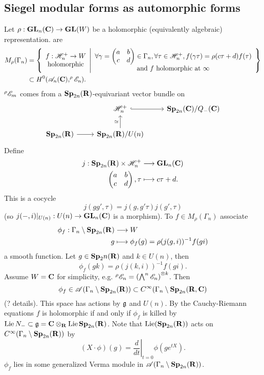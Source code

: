 \subsection{Siegel modular forms as automorphic forms}
Let $\rho:\GL_n(\C)\to \GL(W)$ be a holomorphic (equivalently algebraic) representation.
 are
\begin{align*}
	M_\rho(\Gamma_n) &= \left\{
		\begin{array}{c} f:\H_n^{+}\to W \\ \text{holomorphic}
		\end{array} \middle|
		\begin{array}{c}
			\forall \gamma =
			\begin{pmatrix} a & b \\ c & d
			\end{pmatrix} \in \Gamma_n,\forall \tau\in \H_n^{+}, f(\gamma \tau) = \rho(c\tau+d)f(\tau)\\
			\text{and }f\text{ holomorphic at }\infty
	\end{array} \right\} \\
	&\subset H^{0}(\CA_n(\C),^{\rho}\CE_n).
\end{align*}
$^{\rho}\mathscr{E}_m$ comes from a $\mathbf{Sp}_{2n}(\mathbf{R})$-equivariant vector bundle on
\[
	\begin{tikzcd}
		& \H_n^{+} \ar[r,hook] & \Sp_{2n}(\C) /Q_-(\C) \\
		\Sp_{2n}(\R) \ar[r] & \Sp_{2n}(\R) /U(n) \ar[u,"\isoto"]
	\end{tikzcd}
\]
Define
\begin{align*}
	j: \mathbf{Sp}_{2n}(\mathbf{R})\times \mathscr H_n^{+} &\longrightarrow \mathbf{GL}_n(\mathbf{C}) \\
	\begin{pmatrix} a & b \\ c & d
	\end{pmatrix} , \tau &\longmapsto c\tau + d
	.
\end{align*}
This is a cocycle
\[
	j(gg',\tau) = j(g,g'\tau)j(g',\tau)
\]
(so $j(-,i)|_{U(n)}:U(n)\to \GL_n(\C)$ is a morphism). To $f\in M_\rho(\Gamma_n)$ associate
\begin{align*}
	\phi_f: \Gamma_n \setminus \mathbf{Sp}_{2n}(\mathbf{R}) &\longrightarrow W \\
	g &\longmapsto \phi_f(g) = \rho(j(g,i))^{-1}f(gi)
\end{align*}
a smooth function. Let $g\in \mathbf{Sp}_2n(\mathbf{R})$ and $k\in U(n)$, then
\[
	\phi_f(gk) = \rho(j(k,i))^{-1}f(gi).
\]
Assume $W=\mathbf{C}$ for simplicity, e.g. $^{\rho}\mathscr{E}_n = \left( \bigwedge^{n}\mathscr{E}_n \right)
^{\otimes k}$. Then
\[
	\phi_f\in \mathscr{A}(\Gamma_n\setminus \mathbf{Sp}_{2n}(\mathbf{R})) \subset C^{\infty}(\Gamma_n\setminus
		\mathbf{Sp}_{2n}(\mathbf{R}, \mathbf{C})	
	\]
	(? details). This space has actions by $\mathfrak{g}$ and $U(n)$. By the Cauchy-Riemann equations
	$f$ is holomorphic if and only if $\phi_f$ is killed by $\operatorname{Lie} N_-\subset
	\mathfrak{g}=\mathbf{C}\otimes_{\mathbf{R}}\operatorname{Lie} \mathbf{Sp}_{2n}(\mathbf{R})$. Note that $\operatorname{Lie}(\mathbf{Sp}_{2n}(\mathbf{R}))$ acts on
	$C^{\infty}(\Gamma_n\setminus \mathbf{Sp}_{2n}(\mathbf{R}))$ by
	\[
		\left( X\cdot \phi \right) (g) = \left.\frac{d}{dt}\right|_{t=0}\phi(ge^{tX}).
	\]
	$\phi_f$ lies in some generalized Verma module in $\mathscr{A}(\Gamma_n\setminus \mathbf{Sp}_{2n}(\mathbf{R}))$.

